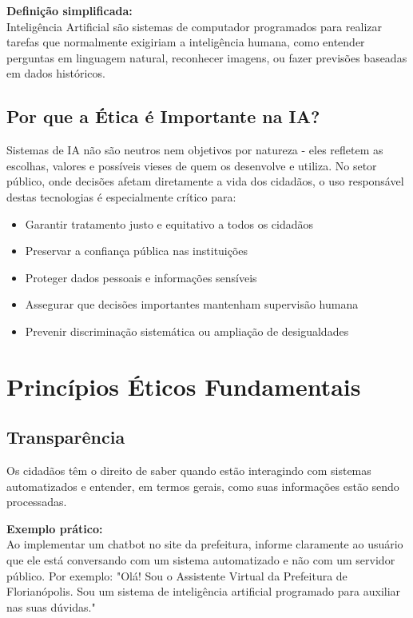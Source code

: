 \documentclass[12pt,a4paper]{article}
\begin{document}
\begin{tcolorbox}[highlight]
\textbf{Definição simplificada:} \\
Inteligência Artificial são sistemas de computador programados para realizar tarefas que normalmente exigiriam a inteligência humana, como entender perguntas em linguagem natural, reconhecer imagens, ou fazer previsões baseadas em dados históricos.
\end{tcolorbox}

\subsection{Por que a Ética é Importante na IA?}
Sistemas de IA não são neutros nem objetivos por natureza - eles refletem as escolhas, valores e possíveis vieses de quem os desenvolve e utiliza. No setor público, onde decisões afetam diretamente a vida dos cidadãos, o uso responsável destas tecnologias é especialmente crítico para:

\begin{itemize}
    \item Garantir tratamento justo e equitativo a todos os cidadãos
    \item Preservar a confiança pública nas instituições
    \item Proteger dados pessoais e informações sensíveis
    \item Assegurar que decisões importantes mantenham supervisão humana
    \item Prevenir discriminação sistemática ou ampliação de desigualdades
\end{itemize}

\newpage
\section{Princípios Éticos Fundamentais}

\subsection{Transparência}
Os cidadãos têm o direito de saber quando estão interagindo com sistemas automatizados e entender, em termos gerais, como suas informações estão sendo processadas.

\begin{tcolorbox}[example]
\textbf{Exemplo prático:} \\
Ao implementar um chatbot no site da prefeitura, informe claramente ao usuário que ele está conversando com um sistema automatizado e não com um servidor público. Por exemplo: "Olá! Sou o Assistente Virtual da Prefeitura de Florianópolis. Sou um sistema de inteligência artificial programado para auxiliar nas suas dúvidas."
\end{tcolorbox}
\end{document}
